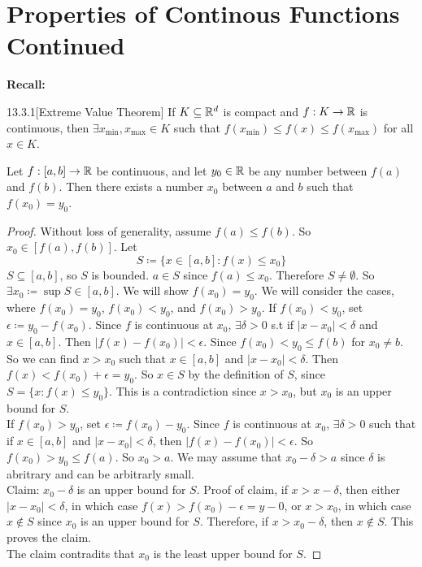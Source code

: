 \documentclass[openany]{report}
\begin{document}
\chapter{Properties of Continous Functions Continued}
\textbf{Recall:}
\begin{manualcorollary}{13.3.1}[Extreme Value Theorem]
    If $K \subseteq \mathbb{R}^d$ is compact and $f: K \rightarrow \mathbb{R}$ is continuous, then $\exists x_{\min}, x_{\max} \in K$ such that $f(x_{\min}) \leq f(x) \leq f(x_{\max})$ for all $x \in K$.
\end{manualcorollary} 
\begin{theorem}
  Let $f: [a,b] \rightarrow \mathbb{R}$ be continuous, and let $y_0 \in \mathbb{R}$ be any number between $f(a)$ and $f(b)$. Then there exists a number $x_0$ between $a$ and $b$ such that $f(x_0) = y_0$.
\end{theorem}   
    \begin{proof}
        Without loss of generality, assume $f(a) \leq f(b)$. So $x_0 \in [f(a), f(b)]$. Let
        \[S \coloneqq \{x \in [a,b]: f(x) \leq x_0\}\]
        $S \subseteq [a,b]$, so $S$ is bounded. $a \in S$ since $f(a) \leq x_0$. Therefore $S \neq \emptyset$.
        So $\exists x_0 \coloneqq \sup S \in [a,b]$. We will show $f(x_0) = y_0$. We will consider the cases, where $f(x_0) = y_0$, $f(x_0) < y_0$, and $f(x_0) > y_0$. If $f(x_0) < y_0$, set $\epsilon \coloneqq y_0 - f(x_0)$. Since $f$ is continuous at $x_0$, $\exists \delta > 0$ s.t if $|x - x_0| < \delta$ and $x \in [a,b]$. Then $|f(x) - f(x_0)| < \epsilon$. Since $f(x_0) < y_0 \leq f(b)$ for $x_0 \neq b$. So we can find $x > x_0$ such that $x \in [a,b]$ and $|x - x_0| < \delta$.  Then $f(x) < f(x_0) + \epsilon = y_0$. So $x \in S$ by the definition of $S$, since $S = \{x: f(x) \leq y_0\}$. This is a contradiction since $x > x_0$, but $x_0$ is an upper bound for $S$.\\[2ex]
        If $f(x_0) > y_0$, set $\epsilon \coloneqq f(x_0) - y_0$. Since $f$ is continuous at $x_0$, $\exists \delta > 0$ such that if $x \in [a,b]$ and $|x - x_0| < \delta$, then $|f(x) - f(x_0)| < \epsilon$. So $f(x_0) > y_0 \leq f(a)$. So $x_0 > a$. We may assume that $x_0 - \delta > a$ since $\delta$ is abritrary and can be arbitrarly small. \\[1ex]
        Claim: $x_0 - \delta$ is an upper bound for $S$. Proof of claim, if $x > x - \delta$, then either $|x - x_0| < \delta$, in which case $f(x) > f(x_0)- \epsilon = y-0$, or $x > x_0$, in which case $x \not\in S$ since $x_0$ is an upper bound for $S$. Therefore, if $x > x_0 - \delta$, then $x \not\in S$. This proves the claim.\\[1ex]
        The claim contradits that $x_0$ is the least upper bound for $S$.  
    \end{proof}
\end{document}
